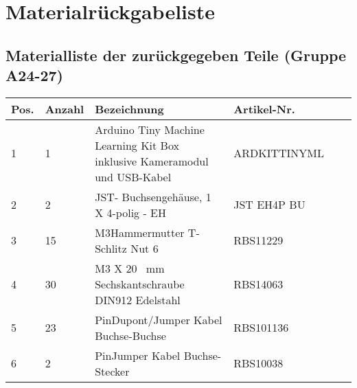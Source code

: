 \documentclass[12pt,a4paper]{scrbook}
\begin{document}
	\chapter{Materialrückgabeliste}
	
	\section{Materialliste der zurückgegeben Teile (Gruppe A24-27)}
		
\fontsize{8}{10}\selectfont
\begin{tabularx}{\textwidth}{|p{0.4cm}|p{1cm}|X|X|p{1cm}|X|}
	\hline 
	\textbf{Pos.}  & \textbf{Anzahl} & \textbf{Bezeichnung} & \textbf{Artikel-Nr.}   \\ \hline
	1 & 1 & Arduino Tiny Machine Learning Kit Box inklusive Kameramodul und USB-Kabel & ARDKITTINYML  \\
	\hline
	2 & 2 & JST- Buchsengehäuse, 1 X 4-polig - EH & JST EH4P BU  \\
	\hline
	3 & 15  & M3Hammermutter T-Schlitz Nut 6 &  RBS11229 \\
	\hline
	4 & 30 & M3 X 20 \ mm Sechskantschraube DIN912 Edelstahl & RBS14063 \\
	\hline
	5 & 23 & PinDupont/Jumper Kabel  Buchse-Buchse  & RBS101136 \\
	\hline
	6 & 2 &PinJumper Kabel Buchse-Stecker & RBS10038 \\
	\hline
	
\end{tabularx}
	
\end{document}
